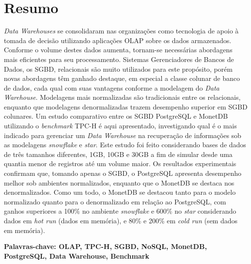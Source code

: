 
\chapter*{Resumo}

\noindent

\textit{Data Warehouses} se consolidaram nas organizações como tecnologia de apoio à tomada de decisão utilizando aplicações OLAP sobre os dados armazenados. Conforme o volume destes dados aumenta, tornam-se necessárias abordagens mais eficientes para seu processamento. Sistemas Gerenciadores de Bancos de Dados, os SGBD, relacionais são muito utilizados para este propósito, porém novas abordagens têm ganhado destaque, em especial a classe colunar de banco de dados, cada qual com suas vantagens conforme a modelagem do \textit{Data Warehouse}. Modelagens mais normalizadas são tradicionais entre os relacionais, enquanto que modelagens denormalizadas trazem desempenho superior em SGBD colunares. Um estudo comparativo entre os SGBD PostgreSQL e MonetDB utilizando o \textit{benchmark} TPC-H é aqui apresentado, investigando qual é o mais indicado para gerenciar um \textit{Data Warehouse} na recuperação de informações sob as modelagens \textit{snowflake} e \textit{star}. Este estudo foi feito considerando bases de dados de três tamanhos diferentes, 1GB, 10GB e 30GB a fim de simular desde uma quantia menor de registros até um volume maior. Os resultados experimentais confirmam que, tomando apenas o SGBD, o PostgreSQL apresenta desempenho melhor sob ambientes normalizados, enquanto que o MonetDB se destaca nos denormalizados. Como um todo, o MonetDB se destacou tanto para o modelo normalizado quanto para o denormalizado em relação ao PostgreSQL, com ganhos superiores a 100\% no ambiente \textit{snowflake} e 600\% no \textit{star} considerando dados em \textit{hot run} (dados em memória), e 80\% e 200\% em \textit{cold run} (sem dados em memória).


\vspace{1cm}
\noindent
\textbf{Palavras-chave: OLAP, TPC-H, SGBD, NoSQL, MonetDB, PostgreSQL, Data Warehouse, Benchmark}


